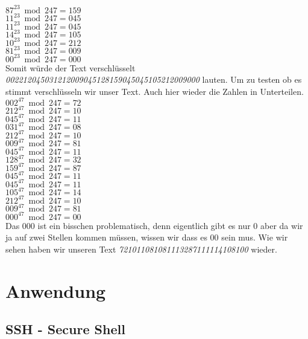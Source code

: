 $ 87^{23} \bmod 247 = 159 $ \\
$ 11^{23} \bmod 247 = 045 $ \\
$ 11^{23} \bmod 247 = 045 $ \\
$ 14^{23} \bmod 247 = 105 $ \\
$ 10^{23} \bmod 247 = 212 $ \\
$ 81^{23} \bmod 247 = 009 $ \\
$ 00^{23} \bmod 247 = 000 $ \\
Somit würde der Text verschlüsselt \textit{002212045031212009045128159045045105212009000} lauten.
Um zu testen ob es stimmt verschlüsseln wir unser Text. Auch hier wieder die Zahlen in Unterteilen.
$ 002^{47} \bmod 247 = 72 $ \\
$ 212^{47} \bmod 247 = 10 $ \\
$ 045^{47} \bmod 247 = 11 $ \\
$ 031^{47} \bmod 247 = 08 $ \\
$ 212^{47} \bmod 247 = 10 $ \\
$ 009^{47} \bmod 247 = 81 $ \\
$ 045^{47} \bmod 247 = 11 $ \\
$ 128^{47} \bmod 247 = 32 $ \\
$ 159^{47} \bmod 247 = 87 $ \\
$ 045^{47} \bmod 247 = 11 $ \\
$ 045^{47} \bmod 247 = 11 $ \\
$ 105^{47} \bmod 247 = 14 $ \\
$ 212^{47} \bmod 247 = 10 $ \\
$ 009^{47} \bmod 247 = 81 $ \\
$ 000^{47} \bmod 247 = 00 $ \\
Das 000 ist ein bisschen problematisch, denn eigentlich gibt es nur 0 aber da wir ja auf zwei Stellen kommen müssen, wissen wir dass es 00 sein mus. Wie wir sehen haben wir unseren Text \textit{721011081081113287111114108100}  wieder.
\section{Anwendung}
\subsection{SSH - Secure Shell}
